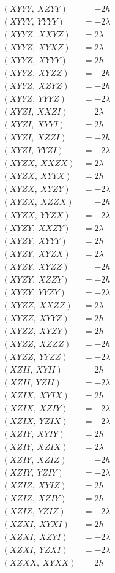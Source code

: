 \documentclass{article}
\begin{document}
\begin{align*}
  (XYYY,\ XZYY) &= - 2 h \\
  (XYYY,\ YYYY) &= - 2 \lambda \\
  (XYYZ,\ XXYZ) &= 2 \lambda \\
  (XYYZ,\ XYXZ) &= 2 \lambda \\
  (XYYZ,\ XYYY) &= 2 h \\
  (XYYZ,\ XYZZ) &= - 2 h \\
  (XYYZ,\ XZYZ) &= - 2 h \\
  (XYYZ,\ YYYZ) &= - 2 \lambda \\
  (XYZI,\ XXZI) &= 2 \lambda \\
  (XYZI,\ XYYI) &= 2 h \\
  (XYZI,\ XZZI) &= - 2 h \\
  (XYZI,\ YYZI) &= - 2 \lambda \\
  (XYZX,\ XXZX) &= 2 \lambda \\
  (XYZX,\ XYYX) &= 2 h \\
  (XYZX,\ XYZY) &= - 2 \lambda \\
  (XYZX,\ XZZX) &= - 2 h \\
  (XYZX,\ YYZX) &= - 2 \lambda \\
  (XYZY,\ XXZY) &= 2 \lambda \\
  (XYZY,\ XYYY) &= 2 h \\
  (XYZY,\ XYZX) &= 2 \lambda \\
  (XYZY,\ XYZZ) &= - 2 h \\
  (XYZY,\ XZZY) &= - 2 h \\
  (XYZY,\ YYZY) &= - 2 \lambda \\
  (XYZZ,\ XXZZ) &= 2 \lambda \\
  (XYZZ,\ XYYZ) &= 2 h \\
  (XYZZ,\ XYZY) &= 2 h \\
  (XYZZ,\ XZZZ) &= - 2 h \\
  (XYZZ,\ YYZZ) &= - 2 \lambda \\
  (XZII,\ XYII) &= 2 h \\
  (XZII,\ YZII) &= - 2 \lambda \\
  (XZIX,\ XYIX) &= 2 h \\
  (XZIX,\ XZIY) &= - 2 \lambda \\
  (XZIX,\ YZIX) &= - 2 \lambda \\
  (XZIY,\ XYIY) &= 2 h \\
  (XZIY,\ XZIX) &= 2 \lambda \\
  (XZIY,\ XZIZ) &= - 2 h \\
  (XZIY,\ YZIY) &= - 2 \lambda \\
  (XZIZ,\ XYIZ) &= 2 h \\
  (XZIZ,\ XZIY) &= 2 h \\
  (XZIZ,\ YZIZ) &= - 2 \lambda \\
  (XZXI,\ XYXI) &= 2 h \\
  (XZXI,\ XZYI) &= - 2 \lambda \\
  (XZXI,\ YZXI) &= - 2 \lambda \\
  (XZXX,\ XYXX) &= 2 h
\end{align*}
\end{document}
